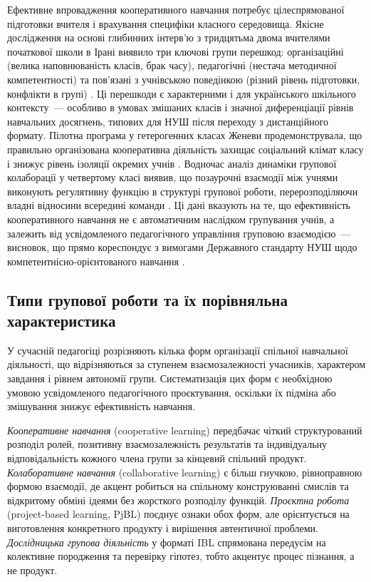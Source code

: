 \documentclass[a4paper,14pt]{extarticle}
\begin{document}
Ефективне впровадження кооперативного навчання потребує цілеспрямованої підготовки вчителя і врахування специфіки класного середовища. Якісне дослідження на основі глибинних інтерв'ю з тридцятьма двома вчителями початкової школи в Ірані виявило три ключові групи перешкод: організаційні (велика наповнюваність класів, брак часу), педагогічні (нестача методичної компетентності) та пов'язані з учнівською поведінкою (різний рівень підготовки, конфлікти в групі) \parencite{Keramati2025120}. Ці перешкоди є характерними і для українського шкільного контексту~--- особливо в умовах змішаних класів і значної диференціації рівнів навчальних досягнень, типових для НУШ після переходу з дистанційного формату. Пілотна програма у гетерогенних класах Женеви продемонструвала, що правильно організована кооперативна діяльність захищає соціальний клімат класу і знижує рівень ізоляції окремих учнів \parencite{Buchs202568}. Водночас аналіз динаміки групової колаборації у четвертому класі виявив, що позаурочні взаємодії між учнями виконують регулятивну функцію в структурі групової роботи, перерозподіляючи владні відносини всередині команди \parencite{Langer-Osuna2020514}. Ці дані вказують на те, що ефективність кооперативного навчання не є автоматичним наслідком групування учнів, а залежить від усвідомленого педагогічного управління груповою взаємодією~--- висновок, що прямо кореспондує з вимогами Державного стандарту НУШ щодо компетентнісно-орієнтованого навчання \parencite{Bibik2017}.

\subsection{Типи групової роботи та їх порівняльна характеристика}

У сучасній педагогіці розрізняють кілька форм організації спільної навчальної діяльності, що відрізняються за ступенем взаємозалежності учасників, характером завдання і рівнем автономії групи. Систематизація цих форм є необхідною умовою усвідомленого педагогічного проєктування, оскільки їх підміна або змішування знижує ефективність навчання.

\textit{Кооперативне навчання} (cooperative learning) передбачає чіткий структурований розподіл ролей, позитивну взаємозалежність результатів та індивідуальну відповідальність кожного члена групи за кінцевий спільний продукт. \textit{Колаборативне навчання} (collaborative learning) є більш гнучкою, рівноправною формою взаємодії, де акцент робиться на спільному конструюванні смислів та відкритому обміні ідеями без жорсткого розподілу функцій. \textit{Проєктна робота} (project-based learning, PjBL) поєднує ознаки обох форм, але орієнтується на виготовлення конкретного продукту і вирішення автентичної проблеми. \textit{Дослідницька групова діяльність} у форматі IBL спрямована передусім на колективне породження та перевірку гіпотез, тобто акцентує процес пізнання, а не продукт.
\end{document}

